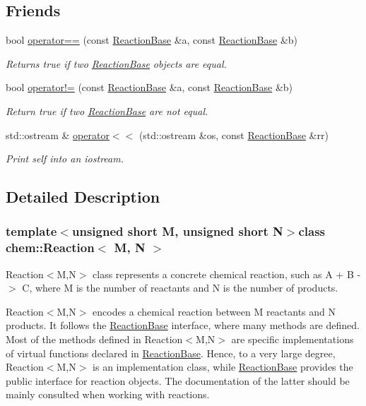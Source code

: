 \subsection*{Friends}
\begin{DoxyCompactItemize}
\item 
bool \hyperlink{classchem_1_1ReactionBase_a0285e054f9aa3055e21cefe65c74fd80}{operator==} (const \hyperlink{classchem_1_1ReactionBase}{Reaction\-Base} \&a, const \hyperlink{classchem_1_1ReactionBase}{Reaction\-Base} \&b)
\begin{DoxyCompactList}\small\item\em Returns true if two \hyperlink{classchem_1_1ReactionBase}{Reaction\-Base} objects are equal. \end{DoxyCompactList}\item 
bool \hyperlink{classchem_1_1ReactionBase_a65d0e9651baf3f48044d585e619ccd6f}{operator!=} (const \hyperlink{classchem_1_1ReactionBase}{Reaction\-Base} \&a, const \hyperlink{classchem_1_1ReactionBase}{Reaction\-Base} \&b)
\begin{DoxyCompactList}\small\item\em Return true if two \hyperlink{classchem_1_1ReactionBase}{Reaction\-Base} are not equal. \end{DoxyCompactList}\item 
std\-::ostream \& \hyperlink{classchem_1_1ReactionBase_aaa825ee7c911e4f932ce39b69960e08a}{operator$<$$<$} (std\-::ostream \&os, const \hyperlink{classchem_1_1ReactionBase}{Reaction\-Base} \&rr)
\begin{DoxyCompactList}\small\item\em Print self into an iostream. \end{DoxyCompactList}\end{DoxyCompactItemize}


\subsection{Detailed Description}
\subsubsection*{template$<$unsigned short M, unsigned short N$>$class chem\-::\-Reaction$<$ M, N $>$}

Reaction$<$\-M,\-N$>$ class represents a concrete chemical reaction, such as A + B -\/$>$ C, where M is the number of reactants and N is the number of products. 

Reaction$<$\-M,\-N$>$ encodes a chemical reaction between M reactants and N products. It follows the \hyperlink{classchem_1_1ReactionBase}{Reaction\-Base} interface, where many methods are defined. Most of the methods defined in Reaction$<$\-M,\-N$>$ are specific implementations of virtual functions declared in \hyperlink{classchem_1_1ReactionBase}{Reaction\-Base}. Hence, to a very large degree, Reaction$<$\-M,\-N$>$ is an implementation class, while \hyperlink{classchem_1_1ReactionBase}{Reaction\-Base} provides the public interface for reaction objects. The documentation of the latter should be mainly consulted when working with reactions. 

